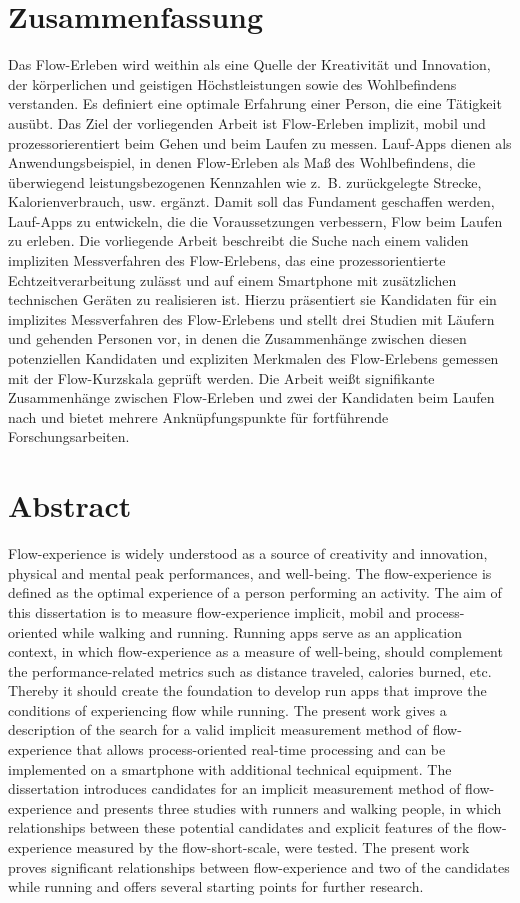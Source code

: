 

\section*{Zusammenfassung} Das Flow-Erleben wird weithin als eine Quelle der Kreativität und Innovation, der körperlichen und geistigen Höchstleistungen sowie des Wohlbefindens verstanden. Es definiert eine optimale Erfahrung einer Person, die eine Tätigkeit ausübt. Das Ziel der vorliegenden Arbeit ist Flow-Erleben implizit, mobil und prozessorierentiert beim Gehen und beim Laufen zu messen. Lauf-Apps dienen als Anwendungsbeispiel, in denen Flow-Erleben als Maß des Wohlbefindens, die überwiegend leistungsbezogenen Kennzahlen wie z.~B. zurückgelegte Strecke, Kalorienverbrauch, usw. ergänzt. Damit soll das Fundament geschaffen werden, Lauf-Apps zu entwickeln, die die Voraussetzungen verbessern, Flow beim Laufen zu erleben. Die vorliegende Arbeit beschreibt die Suche nach einem validen impliziten Messverfahren des Flow-Erlebens, das eine prozessorientierte Echtzeitverarbeitung zulässt und auf einem Smartphone mit zusätzlichen technischen Geräten zu realisieren ist. Hierzu präsentiert sie Kandidaten für ein implizites Messverfahren des Flow-Erlebens und stellt drei Studien mit Läufern und gehenden Personen vor, in denen die Zusammenhänge zwischen diesen potenziellen Kandidaten und expliziten Merkmalen des Flow-Erlebens gemessen mit der Flow-Kurzskala geprüft werden. Die Arbeit weißt signifikante Zusammenhänge zwischen Flow-Erleben und zwei der Kandidaten beim Laufen nach und bietet mehrere Anknüpfungspunkte für fortführende Forschungsarbeiten. 
\pagebreak

\section*{Abstract} Flow-experience is widely understood as a source of creativity and innovation, physical and mental peak performances, and well-being. The flow-experience is defined as the optimal experience of a person performing an activity. The aim of this dissertation is to measure flow-experience implicit, mobil and process-oriented while walking and running. Running apps serve as an application context, in which flow-experience as a measure of well-being, should complement the performance-related metrics such as distance traveled, calories burned, etc. Thereby it should create the foundation to develop run apps that improve the conditions of experiencing flow while running. The present work gives a description of the search for a valid implicit measurement method of flow-experience that allows process-oriented real-time processing and can be implemented on a smartphone with additional technical equipment. The dissertation introduces candidates for an implicit measurement method of flow-experience and presents three studies with runners and walking people, in which relationships between these potential candidates and explicit features of the flow-experience measured by the flow-short-scale, were tested. The present work proves significant relationships between flow-experience and two of the candidates while running and offers several starting points for further research. 
